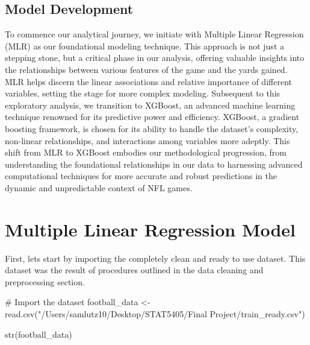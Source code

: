 \documentclass[
  super,
  preprint,
  3p]{elsarticle}
\newenvironment{Shaded}{\begin{snugshade}}{\end{snugshade}}
\newcommand{\CommentTok}[1]{\textcolor[rgb]{0.37,0.37,0.37}{#1}}
\newcommand{\FunctionTok}[1]{\textcolor[rgb]{0.28,0.35,0.67}{#1}}
\newcommand{\NormalTok}[1]{\textcolor[rgb]{0.00,0.23,0.31}{#1}}
\newcommand{\OtherTok}[1]{\textcolor[rgb]{0.00,0.23,0.31}{#1}}
\newcommand{\StringTok}[1]{\textcolor[rgb]{0.13,0.47,0.30}{#1}}
\begin{document}
\hypertarget{model-development}{%
\subsection{Model Development}\label{model-development}}

To commence our analytical journey, we initiate with Multiple Linear
Regression (MLR) as our foundational modeling technique. This approach
is not just a stepping stone, but a critical phase in our analysis,
offering valuable insights into the relationships between various
features of the game and the yards gained. MLR helps discern the linear
associations and relative importance of different variables, setting the
stage for more complex modeling. Subsequent to this exploratory
analysis, we transition to XGBoost, an advanced machine learning
technique renowned for its predictive power and efficiency. XGBoost, a
gradient boosting framework, is chosen for its ability to handle the
dataset's complexity, non-linear relationships, and interactions among
variables more adeptly. This shift from MLR to XGBoost embodies our
methodological progression, from understanding the foundational
relationships in our data to harnessing advanced computational
techniques for more accurate and robust predictions in the dynamic and
unpredictable context of NFL games.

\hypertarget{multiple-linear-regression-model}{%
\section{Multiple Linear Regression
Model}\label{multiple-linear-regression-model}}

First, lets start by importing the completely clean and ready to use
dataset. This dataset was the result of procedures outlined in the data
cleaning and preprocessing section.

\begin{Shaded}
\begin{Highlighting}[]
\CommentTok{\# Import the dataset}
\NormalTok{football\_data }\OtherTok{\textless{}{-}} \FunctionTok{read.csv}\NormalTok{(}\StringTok{"/Users/samlutz10/Desktop/STAT5405/Final Project/train\_ready.csv"}\NormalTok{)}

\FunctionTok{str}\NormalTok{(football\_data)}
\end{Highlighting}
\end{Shaded}
\end{document}
